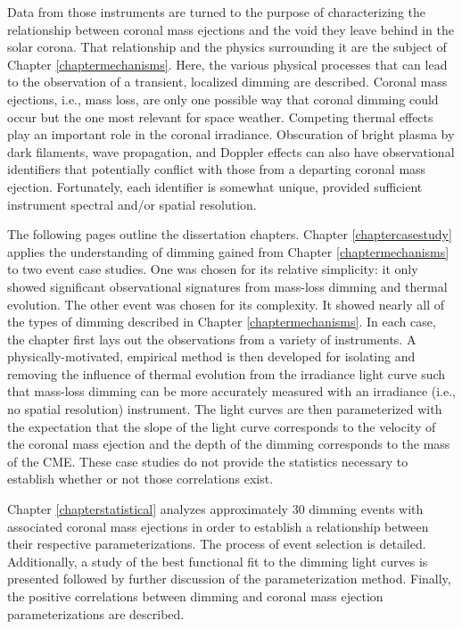 Data from those instruments are turned to the purpose of characterizing the relationship between coronal mass ejections and the void they leave behind in the solar corona. That relationship and the physics surrounding it are the subject of Chapter \ref{chaptermechanisms}. Here, the various physical processes that can lead to the observation of a transient, localized dimming are described. Coronal mass ejections, i.e., mass loss, are only one possible way that coronal dimming could occur but the one most relevant for space weather. Competing thermal effects play an important role in the coronal irradiance. Obscuration of bright plasma by dark filaments, wave propagation, and Doppler effects can also have observational identifiers that potentially conflict with those from a departing coronal mass ejection. Fortunately, each identifier is somewhat unique, provided sufficient instrument spectral and/or spatial resolution. 

The following pages outline the dissertation chapters. Chapter \ref{chaptercasestudy} applies the understanding of dimming gained from Chapter \ref{chaptermechanisms} to two event case studies. One was chosen for its relative simplicity: it only showed significant observational signatures from mass-loss dimming and thermal evolution. The other event was chosen for its complexity. It showed nearly all of the types of dimming described in Chapter \ref{chaptermechanisms}. In each case, the chapter first lays out the observations from a variety of instruments. A physically-motivated, empirical method is then developed for isolating and removing the influence of thermal evolution from the irradiance light curve such that mass-loss dimming can be more accurately measured with an irradiance (i.e., no spatial resolution) instrument. The light curves are then parameterized with the expectation that the slope of the light curve corresponds to the velocity of the coronal mass ejection and the depth of the dimming corresponds to the mass of the CME. These case studies do not provide the statistics necessary to establish whether or not those correlations exist. 

Chapter \ref{chapterstatistical} analyzes approximately 30 dimming events with associated coronal mass ejections in order to establish a relationship between their respective parameterizations. The process of event selection is detailed. Additionally, a study of the best functional fit to the dimming light curves is presented followed by further discussion of the parameterization method. Finally, the positive correlations between dimming and coronal mass ejection parameterizations are described. 

